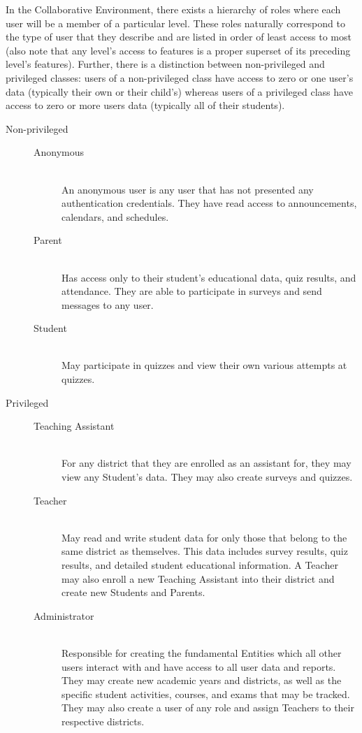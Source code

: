 In the Collaborative Environment, there exists a hierarchy of roles where each user will be a member of a particular level. These roles naturally correspond to the type of user that they describe and are listed in order of least access to most (also note that any level's access to features is a proper superset of its preceding level's features). Further, there is a distinction between non-privileged and privileged classes: users of a non-privileged class have access to zero or one user's data (typically their own or their child's) whereas users of a privileged class have access to zero or more users data (typically all of their students).

\begin{description}
	\item [Non-privileged] \hfill
		\begin{description}
			\item [Anonymous] \hfill \\ An anonymous user is any user that has not presented any authentication credentials. They have read access to announcements, calendars, and schedules.
			\item [Parent] \hfill \\ Has access only to their student's educational data, quiz results, and attendance. They are able to participate in surveys and send messages to any user.
			\item [Student] \hfill \\ May participate in quizzes and view their own various attempts at quizzes.
		\end{description}
	\item [Privileged] \hfill
		\begin{description}
			\item [Teaching Assistant] \hfill \\ For any district that they are enrolled as an assistant for, they may view any Student's data. They may also create surveys and quizzes.
			\item [Teacher] \hfill \\ May read and write student data for only those that belong to the same district as themselves. This data includes survey results, quiz results, and detailed student educational information. A Teacher may also enroll a new Teaching Assistant into their district and  create new Students and Parents.
			\item [Administrator] \hfill \\ Responsible for creating the fundamental Entities which all other users interact with and have access to all user data and reports. They may create new academic years and districts, as well as the specific student activities, courses, and exams that may be tracked. They may also create a user of any role and assign Teachers to their respective districts.
		\end{description}
\end{description}